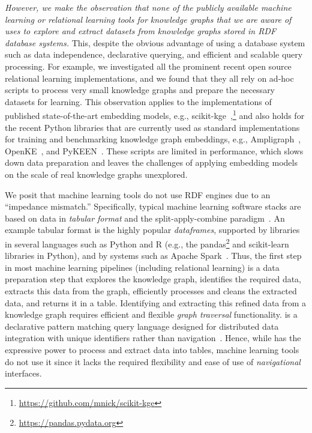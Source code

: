\textit{However, we make the observation that none of the publicly available machine learning or relational learning tools for knowledge graphs that we are aware of uses \sparql
to explore and extract datasets from knowledge graphs stored in RDF database systems.} 
 This, despite the obvious advantage of using a database system such as data independence, declarative querying, and efficient and scalable query processing.
For example, we investigated all the prominent recent open source relational learning implementations,
and we found that they all rely on ad-hoc scripts to process very small knowledge graphs and prepare the necessary datasets for learning.
This observation applies to the implementations of published state-of-the-art embedding models, e.g., scikit-kge~\cite{nickel2016holographic, nickel2011three},\footnote{\url{https://github.com/mnick/scikit-kge}}
and also holds for the recent Python libraries that are currently used as standard implementations for training and benchmarking knowledge graph embeddings, e.g.,
Ampligraph~\cite{ampligraph}, OpenKE~\cite{han2018openke}, and PyKEEN~\cite{ali2020pykeen}.
These scripts are limited in performance, which slows down data preparation and leaves the challenges of applying embedding models on the scale of real knowledge graphs unexplored. 

We posit that machine learning tools do not use RDF engines due to an ``impedance mismatch.''
Specifically, typical machine learning software stacks are based on data in \textit{tabular format} and the split-apply-combine paradigm~\cite{Wickham_2011}.
An example tabular format is the highly popular \textit{dataframes},
supported by libraries in several languages such as Python and R
(e.g., the pandas\footnote{\url{https://pandas.pydata.org}}
and scikit-learn libraries in Python),
and by systems such as Apache Spark~\cite{apacheSpark}.
Thus, the first step in most machine learning pipelines
(including relational learning) 
is a data preparation step that
explores the knowledge graph,
identifies the required data,
extracts this data from the graph,
efficiently processes and cleans the extracted data,
and returns it in a table.
Identifying and extracting this refined data from a knowledge graph requires efficient and flexible \textit{graph traversal} functionality. \sparql is a declarative pattern matching query language
designed for distributed data integration with unique identifiers 
rather than navigation~\cite{Matsumoto2018MappingRG}. 
Hence, while \sparql has the expressive power to process and extract data into tables, machine learning tools do not use it  since it lacks the required flexibility and ease of use of \textit{navigational} interfaces.


